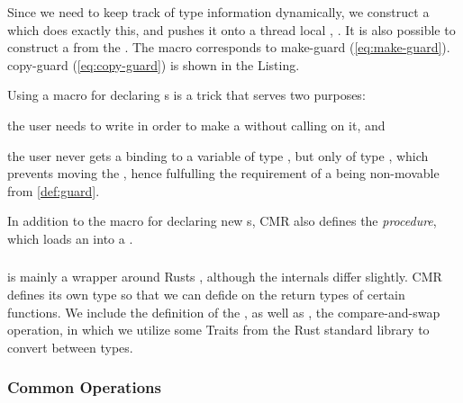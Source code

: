 Since we need to keep track of type information dynamically, we construct a 
which does exactly this, and pushes it onto a thread local , .  It is also
possible to construct a  from the .  The  macro corresponds
to make-guard (\cref{eq:make-guard}). copy-guard (\cref{eq:copy-guard}) is shown in the Listing.

Using a macro for declaring s is a trick that serves two purposes:
\begin{enumerate*}[1) ]
  \item the user needs to write  in order to make a  without calling
     on it,
  and\item the user never gets a binding to a variable of type , but only of type
    , which prevents moving the , hence fulfulling the requirement of a
     being non-movable from \cref{def:guard}.
\end{enumerate*}

In addition to the  macro for declaring new s, CMR also defines the
 \emph{procedure}, which loads an  into a .


\subsubsection{}

 is mainly a wrapper around Rusts , although the internals differ
slightly. CMR defines its own type so that we can defide on the return types of certain functions.
We include the definition of the , as well as , the compare-and-swap
operation, in which we utilize some Traits from the Rust standard library to convert between types.

\begin{figure}[ht]
  
\end{figure}


\subsubsection{Common Operations}

\begin{figure}[ht]
  
\end{figure}


